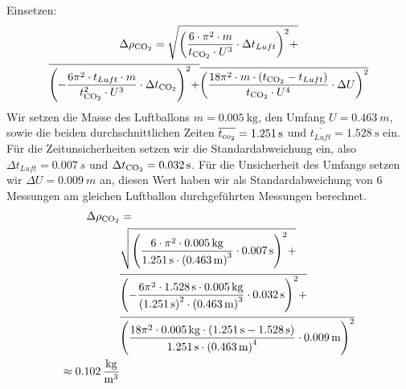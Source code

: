 \documentclass{article}
\begin{document}
              Einsetzen:
              \begin{equation}
                  \begin{gathered}
                      \Delta \rho_{\ce{CO2}} =
                      \sqrt{ { \left( \frac{ 6 \cdot \pi^2 \cdot m }{ t_{\ce{CO2}} \cdot U^3 } \cdot \Delta t_{Luft} \right) }^2 + } \\
                      \overline{ { \left( -\frac{ 6 \pi^2 \cdot t_{Luft} \cdot m }{ t_{\ce{CO2}}^2 \cdot U^3 } \cdot \Delta t_{\ce{CO2}} \right)}^2 + }
                      \overline{ { \left( \frac{ 18 \pi^2 \cdot m \cdot ( t_{\ce{CO2}} - t_{Luft} ) }{ t_{\ce{CO2}} \cdot U^4 } \cdot \Delta U \right)}^2 }
                  \end{gathered}
              \end{equation}
              Wir setzen die Masse des Luftballons \(m = \SI{0.005}{\kilogram}\), den Umfang \( U = \SI{0.463}{m} \),
              sowie die beiden durchschnittlichen Zeiten \( \overline{t_{\ce{co2}}} = \SI{1.251}{\second} \) und \(\overline{t_{Luft}} = \SI{1.528}{\second} \) ein.
              Für die Zeitunsicherheiten setzen wir die Standardabweichung ein, also \( \Delta t_{Luft} = \SI{0.007}{s} \) und \( \Delta t_{\ce{CO2}} = \SI{0.032}{s} \).
              Für die Unsicherheit des Umfangs setzen wir \( \Delta U = \SI{0.009}{m} \) an,
              diesen Wert haben wir als Standardabweichung von 6 Messungen am gleichen Luftballon durchgeführten Messungen berechnet.
              \begin{equation}
                  \begin{aligned}
                      \Delta \rho_{\ce{CO2}} & =                                                                                                                                                                              \\
                                             & \sqrt{ { \left( \frac{6 \cdot \pi^2 \cdot \SI{0.005}{kg} }{ \SI{1.251}{s} \cdot {(\SI{0.463}{m})}^3 } \cdot \SI{0.007}{s} \right)}^2 +}                                        \\
                                             & \overline{ { \left( -\frac{6 \pi^2 \cdot \SI{1.528}{s} \cdot \SI{0.005}{kg} }{ {(\SI{1.251}{s})}^2 \cdot {(\SI{0.463}{m})}^3 } \cdot \SI{0.032}{s} \right)}^2 + }              \\
                                             & \overline{ { \left( \frac{ 18 \pi^2 \cdot \SI{0.005}{kg} \cdot ( \SI{1.251}{s} - \SI{1.528}{s} ) }{ \SI{1.251}{s} \cdot {(\SI{0.463}{m})}^4 } \cdot \SI{0.009}{m} \right)}^2 } \\
                      \approx \SI{0.102}{\frac{kg}{m^3}}
                  \end{aligned}
              \end{equation}
\end{document}
